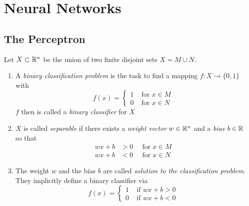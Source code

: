 \newpage
\section{Neural Networks}

\subsection{The Perceptron}

\begin{definition}
    Let \( X \subset \mathbb{R}^n \) be the union of two finite disjoint sets \( X = M \cup N \).
    \begin{enumerate}
        \item A \emph{binary classification problem} is the task to find a mapping \( f: X \to \{ 0, 1 \} \) with
              \[
                  f(x) = \left \{
                  \begin{array}{ll}
                      1 & \text{ for } x \in M \\
                      0 & \text{ for } x \in N
                  \end{array}
                  \right.
              \]
              \( f \) then is called a \emph{binary classifier} for \( X \)
        \item \( X \) is called \emph{separable} if there exists a \emph{weight vector} \( w \in \mathbb{R}^n \)
              and a \emph{bias} \( b \in \mathbb{R} \) so that
              \[
                  \begin{split}
                      wx + b & > 0 \hspace{1em}\text{ for } x \in M \\
                      wx + b & < 0 \hspace{1em}\text{ for } x \in N
                  \end{split}
              \]
        \item The weight \( w \) and the bias \( b \) are called \emph{solution to the classification problem}.
              They implicitly define a binary classifier via
              \[
                  f(x) = \left \{
                  \begin{array}{ll}
                      1 & \text{ if } wx + b > 0 \\
                      0 & \text{ if } wx + b < 0
                  \end{array}
                  \right.
              \]
    \end{enumerate}
\end{definition}
\bigskip


